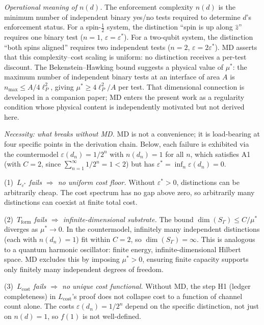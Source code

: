 \documentclass[11pt,a4paper]{article}
\theoremstyle{definition}
\newcommand{\eps}{\varepsilon}
\begin{document}
\begin{tcolorbox}[apfbox, title={MD: Uniform Per-Test Cost Floor (Regularity Condition)}]
\smallskip
\noindent\textit{Operational meaning of $n(d)$.}  The enforcement complexity $n(d)$ is the minimum number of independent binary yes/no tests required to determine $d$'s enforcement status.  For a spin-$\tfrac{1}{2}$ system, the distinction ``spin is up along $\hat{z}$'' requires one binary test ($n = 1$, $\eps = \eps^*$).  For a two-qubit system, the distinction ``both spins aligned'' requires two independent tests ($n = 2$, $\eps = 2\eps^*$).  MD asserts that this complexity--cost scaling is uniform: no distinction receives a per-test discount.  The Bekenstein--Hawking bound suggests a physical value of $\mu^*$: the maximum number of independent binary tests at an interface of area $A$ is $n_{\max} \le A / 4\ell_P^2$, giving $\mu^* \ge 4\ell_P^2 / A$ per test.  That dimensional connection is developed in a companion paper; MD enters the present work as a regularity condition whose physical content is independently motivated but not derived here.

\smallskip
\noindent\textit{Necessity: what breaks without MD.}  MD is not a convenience; it is load-bearing at four specific points in the derivation chain.  Below, each failure is exhibited via the countermodel $\eps(d_n) = 1/2^n$ with $n(d_n) = 1$ for all $n$, which satisfies A1 (with $C = 2$, since $\sum_{n=1}^\infty 1/2^n = 1 < 2$) but has $\eps^* = \inf_n \eps(d_n) = 0$.

\noindent(1)~\textit{$L_{\eps^*}$ fails $\Rightarrow$ no uniform cost floor.}  Without $\eps^* > 0$, distinctions can be arbitrarily cheap.  The cost spectrum has no gap above zero, so arbitrarily many distinctions can coexist at finite total cost.

\noindent(2)~\textit{$T_{\mathrm{form}}$ fails $\Rightarrow$ infinite-dimensional substrate.}  The bound $\dim(S_\Gamma) \le C/\mu^*$ diverges as $\mu^* \to 0$.  In the countermodel, infinitely many independent distinctions (each with $n(d_n) = 1$) fit within $C = 2$, so $\dim(S_\Gamma) = \infty$.  This is analogous to a quantum harmonic oscillator: finite energy, infinite-dimensional Hilbert space.  MD excludes this by imposing $\mu^* > 0$, ensuring finite capacity supports only finitely many independent degrees of freedom.

\noindent(3)~\textit{$L_{\mathrm{cost}}$ fails $\Rightarrow$ no unique cost functional.}  Without MD, the step H1 (ledger completeness) in $L_{\mathrm{cost}}$'s proof does not collapse cost to a function of channel count alone.  The costs $\eps(d_n) = 1/2^n$ depend on the specific distinction, not just on $n(d) = 1$, so $f(1)$ is not well-defined.


\end{tcolorbox}
\end{document}
